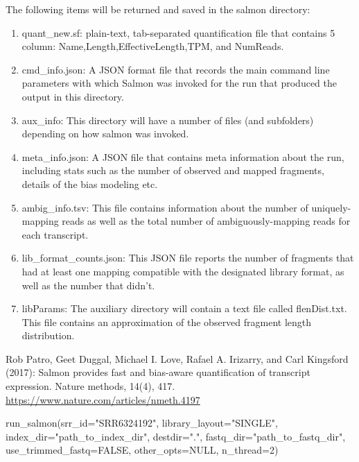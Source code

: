 \documentclass[letterpaper]{book}
\begin{document}
%
\begin{Value}
The following items will be returned and saved in the salmon directory:
\begin{enumerate}

\item quant\_new.sf: plain-text, tab-separated quantification file that contains 5 column: Name,Length,EffectiveLength,TPM, and NumReads.
\item cmd\_info.json: A JSON format file that records the main command line parameters with which Salmon was invoked for the run that produced the output in this directory.
\item aux\_info: This directory will have a number of files (and subfolders) depending on how salmon was invoked.
\item meta\_info.json: A JSON file that contains meta information about the run, including stats such as the number of observed and mapped fragments, details of the bias modeling etc. 
\item ambig\_info.tsv: This file contains information about the number of uniquely-mapping reads as well as the total number of ambiguously-mapping reads for each transcript. 
\item lib\_format\_counts.json: This JSON file reports the number of fragments that had at least one mapping compatible with the designated library format, as well as the number that didn't. 
\item libParams: The auxiliary directory will contain a text file called flenDist.txt. This file contains an approximation of the observed fragment length distribution.

\end{enumerate}

\end{Value}
%
\begin{References}\relax
Rob Patro, Geet Duggal, Michael I. Love, Rafael A. Irizarry, and Carl Kingsford (2017):
Salmon provides fast and bias-aware quantification of transcript expression. Nature methods, 14(4), 417.
\url{https://www.nature.com/articles/nmeth.4197}
\end{References}
%
\begin{Examples}
\begin{ExampleCode}
run_salmon(srr_id="SRR6324192", library_layout="SINGLE", index_dir="path_to_index_dir",
destdir=".", fastq_dir="path_to_fastq_dir", use_trimmed_fastq=FALSE,
other_opts=NULL, n_thread=2)

\end{ExampleCode}
\end{Examples}
\end{document}
